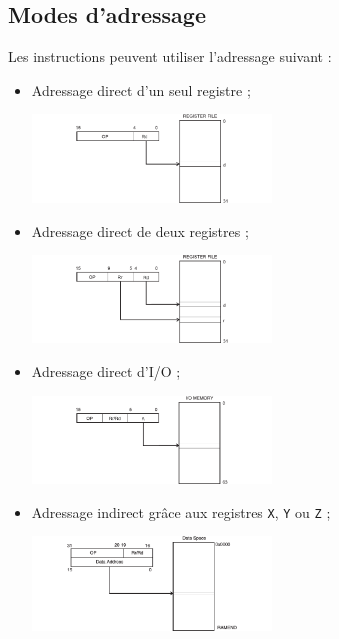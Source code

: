 \documentclass[11pt]{article}
\begin{document}
\subsection{Modes d'adressage}
Les instructions peuvent utiliser l'adressage suivant :
\begin{itemize}
  \item Adressage direct d'un seul registre ;
   \begin{center}
     \includegraphics[width=0.5\textwidth]{images/direct_adressing.png}
   \end{center}
 \item Adressage direct de deux registres ;
   \begin{center}
     \includegraphics[width=0.5\textwidth]{images/direct_adressing_double.png}
   \end{center}
  \item Adressage direct d'I/O ;
   \begin{center}
     \includegraphics[width=0.5\textwidth]{images/direct_adressing_IO.png}
   \end{center}
  \item Adressage indirect grâce aux registres \texttt{X}, \texttt{Y}
    ou \texttt{Z} ;
   \begin{center}
     \includegraphics[width=0.5\textwidth]{images/direct_data_adressing.png}
   \end{center}

\end{itemize}
\end{document}
